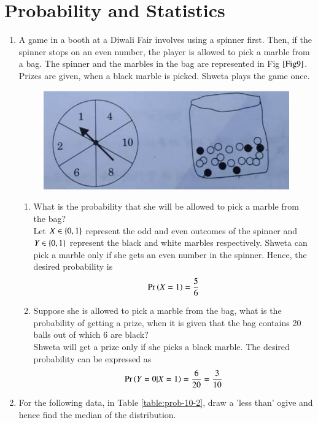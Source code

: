 \documentclass[journal,12pt,twocolumn]{IEEEtran}
\renewcommand\thesection{\arabic{section}}
\begin{document}
\section{Probability and Statistics}
\begin{enumerate}[label=\thesection.\arabic*.,ref=\thesection.\theenumi]
    \item A game in a booth at a Diwali Fair involves using a spinner first. Then, if the spinner stops on an even number, the player is allowed to pick a marble from a bag. The spinner and the marbles in the bag are represented in Fig $\ref{Fig9}$.\\
    Prizes are given, when a black marble is picked. Shweta plays the game once.
    \begin{figure}[h!]
        \centering
        \includegraphics[width=0.5\columnwidth]{Fig9.png}
	    \caption{}
	    \label{Fig9}
    \end{figure} 
    \begin{enumerate}
        \item What is the probability that she will be allowed to pick a marble from the bag?\\
		\solution Let $X\in \left\{0,1\right\}$ represent the odd and even outcomes of the spinner and $Y \in \left\{0,1\right\}$ represent the black and white marbles respectively.  Shweta can pick a marble only if she gets an even number in the spinner.  Hence, the desired probability is 
		    \begin{align}
			    \Pr\left(X = 1\right) = \frac{5}{6}
		    \end{align}
        \item Suppose she is allowed to pick a marble from the bag, what is the probability of getting a prize, when it is given that the bag contains 20 balls out of which 6 are black?\\
		\solution Shweta will get a prize only if she picks a black marble.  The desired probability can be expressed as 
		    \begin{align}
			    \Pr\left(Y = 0 | X = 1\right) = \frac{6}{20} = \frac{3}{10}
		    \end{align}
    \end{enumerate}
        \item For the following data, in Table 
			\ref{table:prob-10-2}, draw a 'less than' ogive and hence find the median of the distribution.
		\begin{table}[!hb]
			\resizebox{\columnwidth}{!}{

}
\end{table}
\end{enumerate}
\end{document}
